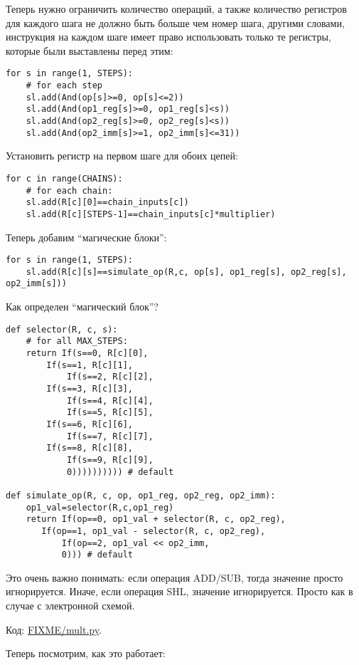 Теперь нужно ограничить количество операций, а также количество регистров для каждого шага не должно быть больше чем
номер шага, другими словами, инструкция на каждом шаге имеет право использовать только те регистры, которые были
выставлены перед этим:

\begin{lstlisting}
for s in range(1, STEPS):
    # for each step
    sl.add(And(op[s]>=0, op[s]<=2))
    sl.add(And(op1_reg[s]>=0, op1_reg[s]<s))
    sl.add(And(op2_reg[s]>=0, op2_reg[s]<s))
    sl.add(And(op2_imm[s]>=1, op2_imm[s]<=31))
\end{lstlisting}

Установить регистр на первом шаге для обоих цепей:

\begin{lstlisting}
for c in range(CHAINS):
    # for each chain:
    sl.add(R[c][0]==chain_inputs[c])
    sl.add(R[c][STEPS-1]==chain_inputs[c]*multiplier)
\end{lstlisting}

Теперь добавим ``магические блоки'':

\begin{lstlisting}
for s in range(1, STEPS):
    sl.add(R[c][s]==simulate_op(R,c, op[s], op1_reg[s], op2_reg[s], op2_imm[s]))
\end{lstlisting}

Как определен ``магический блок''?

\begin{lstlisting}
def selector(R, c, s):
    # for all MAX_STEPS:
    return If(s==0, R[c][0],
	    If(s==1, R[c][1],
            If(s==2, R[c][2],
	    If(s==3, R[c][3],
            If(s==4, R[c][4],
            If(s==5, R[c][5],
	    If(s==6, R[c][6],
            If(s==7, R[c][7],
	    If(s==8, R[c][8],
            If(s==9, R[c][9],
	        0)))))))))) # default

def simulate_op(R, c, op, op1_reg, op2_reg, op2_imm):
    op1_val=selector(R,c,op1_reg)
    return If(op==0, op1_val + selector(R, c, op2_reg),
	   If(op==1, op1_val - selector(R, c, op2_reg),
           If(op==2, op1_val << op2_imm,
	       0))) # default
\end{lstlisting}

Это очень важно понимать: если операция ADD/SUB, тогда значение  просто игнорируется.
Иначе, если операция SHL, значение  игнорируется.
Просто как в случае с электронной схемой.

Код: \url{FIXME/mult.py}.

Теперь посмотрим, как это работает:

